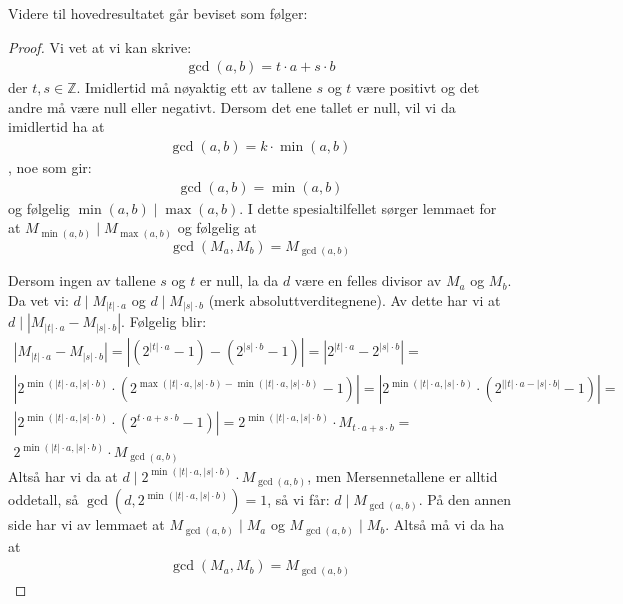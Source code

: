 \documentclass[a4paper,twoside]{article}
\theoremstyle{plain}
\newcommand{\setZ}{\mathbb{Z}}
\begin{document}
Videre til hovedresultatet går beviset som følger:
\begin{proof}
Vi vet at vi kan skrive:
\begin{align}
\gcd(a,b)=t\cdot a+s\cdot b
\end{align}
der $t,s \in \setZ$.
Imidlertid må nøyaktig ett av tallene $s$ og $t$ være positivt og det andre må være null eller negativt. Dersom det ene tallet er null, vil vi da imidlertid ha at 
\begin{align}
\gcd(a,b)=k\cdot \min(a,b)
\end{align}
, noe som gir:
\begin{align}
\gcd(a,b)=\min(a,b)
\end{align}
og følgelig
$\min(a,b)\mid \max(a,b)$. I dette spesialtilfellet sørger lemmaet for at $M_{\min(a,b)}\mid M_{\max(a,b)}$ og følgelig at 
\[\gcd\left(M_a,M_b\right)=M_{\gcd(a,b)} \]

Dersom ingen av tallene $s$ og $t$ er null, la da $d$ være en felles divisor av $M_a$ og $M_b$. Da vet vi:
$d\mid M_{|t|\cdot a}$ og $d\mid M_{|s|\cdot b}$ (merk absoluttverditegnene). Av dette har vi at $d\mid \left| M_{|t|\cdot a}-M_{|s|\cdot b}\right|$. Følgelig blir:
\begin{align}
\left| M_{|t|\cdot a}-M_{|s|\cdot b}\right|= \left| \left(2^{|t|\cdot a}-1\right)- \left(2^{|s|\cdot b}-1\right)\right|=\left| 2^{|t|\cdot a} -2^{|s|\cdot b}\right| =\\ \left| 2^{\min\left(|t|\cdot a,|s|\cdot b\right)}\cdot\left(2^{\max\left(|t|\cdot a,|s|\cdot b\right)-\min\left(|t|\cdot a,|s|\cdot b\right)}-1\right) \right|= \left| 2^{\min\left(|t|\cdot a,|s|\cdot b\right)}\cdot\left(2^{\left| |t|\cdot a-|s|\cdot b\right|}-1\right) \right|=\\
\left| 2^{\min\left(|t|\cdot a,|s|\cdot b\right)}\cdot\left(2^{t\cdot a+s\cdot b}-1\right) \right|=2^{\min\left(|t|\cdot a,|s|\cdot b\right)}\cdot M_{t\cdot a+s\cdot b}= \\ 2^{\min\left(|t|\cdot a,|s|\cdot b\right)}\cdot M_{\gcd(a,b)}
\end{align}
Altså har vi da at $d \mid 2^{\min\left(|t|\cdot a,|s|\cdot b\right)}\cdot M_{\gcd(a,b)}$, men Mersennetallene er alltid oddetall, så  $\gcd\left(d, 2^{\min\left(|t|\cdot a,|s|\cdot b\right)}\right)=1$, så vi får:
$d \mid M_{\gcd(a,b)}$. På den annen side har vi av lemmaet at $M_{\gcd(a,b)} \mid M_a$ og $M_{\gcd(a,b)} \mid M_b$. Altså må vi da ha at
\begin{align}
\gcd\left(M_a,M_b\right)=M_{\gcd(a,b)}
\end{align}
\end{proof}
\end{document}
